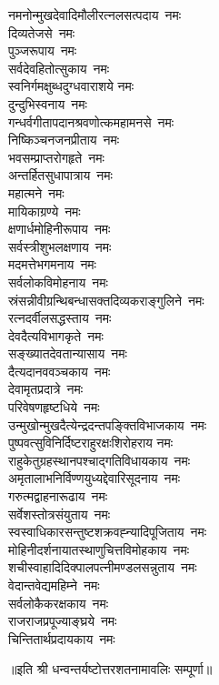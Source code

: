 \begin{multicols}{2}
\begin{flushleft}
नमनोन्मुखदेवादिमौलीरत्न\-लसत्पदाय~नमः\\
दिव्यतेजसे~नमः\\
पुञ्जरूपाय~नमः\\
सर्वदेवहितोत्सुकाय~नमः\\
स्वनिर्गमक्षुब्धदुग्धवाराशये नमः\hfill{}\\
दुन्दुभिस्वनाय~नमः\\
गन्धर्वगीतापदानश्रवणोत्क\-महामनसे~नमः\\
निष्किञ्चनजनप्रीताय~नमः\\
भवसम्प्राप्तरोगहृते~नमः\\
अन्तर्हितसुधापात्राय~नमः\\
महात्मने~नमः\\
मायिकाग्रण्ये~नमः\\
क्षणार्धमोहिनीरूपाय~नमः\\
सर्वस्त्रीशुभलक्षणाय~नमः\\
मदमत्तेभगमनाय~नमः\hfill{}\\
सर्वलोकविमोहनाय~नमः\\
स्रंसन्नीवीग्रन्थिबन्धासक्त\-दिव्यकराङ्गुलिने~नमः\\
रत्नदर्वीलसद्धस्ताय~नमः\\
देवदैत्यविभागकृते~नमः\\
सङ्ख्यातदेवतान्यासाय~नमः\\
दैत्यदानववञ्चकाय~नमः\\
देवामृतप्रदात्रे~नमः\\
परिवेषणहृष्टधिये~नमः\\
उन्मुखोन्मुखदैत्येन्द्रदन्त\-पङ्क्तिविभाजकाय~नमः\\
पुष्पवत्सुविनिर्दिष्टराहुरक्षः\-शिरोहराय नमः\hfill{}\\
राहुकेतुग्रहस्थानपश्चाद्गति\-विधायकाय~नमः\\
अमृतालाभनिर्विण्ण\-युध्यद्देवारि\-सूदनाय~नमः\\
गरुत्मद्वाहनारूढाय~नमः\\
सर्वेशस्तोत्रसंयुताय~नमः\\
स्वस्वाधिकारसन्तुष्ट\-शक्रवह्न्यादिपूजिताय~नमः\\
मोहिनीदर्शनायात\-स्थाणुचित्तविमोहकाय~नमः\\
शचीस्वाहादिदिक्पालपत्नी\-मण्डलसन्नुताय~नमः\\
वेदान्तवेद्यमहिम्ने~नमः\\
सर्वलोकैकरक्षकाय~नमः\\
राजराजप्रपूज्याङ्घ्रये~नमः\hfill{}\\
चिन्तितार्थप्रदायकाय~नमः\\
\end{flushleft}
\end{multicols}
॥इति श्री धन्वन्तर्यष्टोत्तरशतनामावलिः सम्पूर्णा॥
